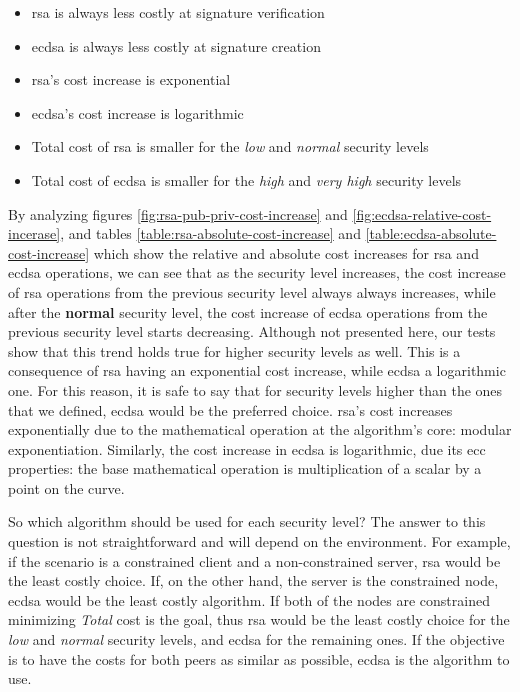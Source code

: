 \documentclass{llncs}
\begin{document}
\begin{itemize}
  \item \gls{rsa} is always less costly at signature verification
  \item \gls{ecdsa} is always less costly at signature creation
  \item \gls{rsa}'s cost increase is exponential
  \item \gls{ecdsa}'s cost increase is logarithmic
  \item Total cost of \gls{rsa} is smaller for the \textit{low} and \textit{normal} security levels
  \item Total cost of \gls{ecdsa} is smaller for the \textit{high} and \textit{very high} security levels
\end{itemize}

By analyzing figures \ref{fig:rsa-pub-priv-cost-increase} and \ref{fig:ecdsa-relative-cost-incerase}, and tables \ref{table:rsa-absolute-cost-increase} and
\ref{table:ecdsa-absolute-cost-increase} which show the relative and absolute cost increases for \gls{rsa} and \gls{ecdsa} operations,
we can see that as the security level increases, the cost increase of \gls{rsa} operations from the previous security level always always increases, 
while after the \textbf{normal} security level, the cost increase of \gls{ecdsa} operations from the previous security level starts decreasing.
Although not presented here,  our tests show that this trend holds true
for higher security levels as well. This is a consequence of \gls{rsa} having an exponential cost increase, while \gls{ecdsa} a logarithmic one.
For this reason, it is safe to say that for security levels higher than the ones that we defined, \gls{ecdsa} would be the preferred choice.
\gls{rsa}'s cost increases exponentially due to the mathematical operation at the algorithm's core: modular exponentiation. Similarly, the cost
increase in \gls{ecdsa} is logarithmic, due its \gls{ecc} properties: the base mathematical operation is multiplication of a scalar by a point on the
curve.

So which algorithm should be used for each security level? The answer to this question is not straightforward and will depend on the environment.
For example, if the scenario is a constrained client and a non-constrained server, \gls{rsa} would be the least costly choice. If, on the
other hand, the server is the constrained node, \gls{ecdsa} would be the least costly algorithm. If both of the nodes are
constrained minimizing \textit{Total} cost is the goal, thus \gls{rsa} would be the least costly choice for the \textit{low} and 
\textit{normal} security levels, and \gls{ecdsa} for the remaining ones. If the objective is to have the costs for both peers as similar as 
possible, \gls{ecdsa} is the algorithm to use.
\end{document}
